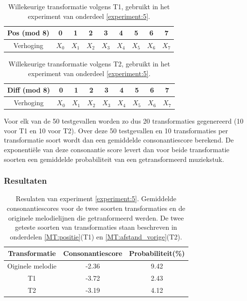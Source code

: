 \begin{table}
  \centering
  \begin{tabular}{c | c c c c c c c c }
    Pos (mod 8) & 0 & 1 & 2 & 3 & 4 & 5 & 6 & 7 \\
    \hline
    \hline
    Verhoging & $X_{0}$ & $X_{1}$ & $X_{2}$ & $X_{3}$ & $X_{4}$ & $X_{5}$ & $X_{6}$ & $X_{7}$ \\
  \end{tabular}
  \caption{Willekeurige transformatie volgens T1, gebruikt in het experiment van onderdeel \ref{experiment:5}.}
  \label{tabel:exp5:T1}
\end{table}

\begin{table}
  \centering
  \begin{tabular}{c | c c c c c c c c }
    Diff (mod 8) & 0 & 1 & 2 & 3 & 4 & 5 & 6 & 7 \\
    \hline
    \hline
    Verhoging & $X_{0}$ & $X_{1}$ & $X_{2}$ & $X_{3}$ & $X_{4}$ & $X_{5}$ & $X_{6}$ & $X_{7}$ \\
  \end{tabular}
  \caption{Willekeurige transformatie volgens T2, gebruikt in het experiment van onderdeel \ref{experiment:5}.}
  \label{tabel:exp5:T2}
\end{table}

Voor elk van de 50 testgevallen worden zo dus 20 transformaties gegenereerd (10 voor T1 en 10 voor T2). Over deze 50 testgevallen en 10 transformaties per transformatie soort wordt dan een gemiddelde consonantiescore berekend. De exponenti\"ele van deze consonantie score levert dan voor beide transformatie soorten een gemiddelde probabiliteit van een getransformeerd muziekstuk.

\subsubsection{Resultaten}

\begin{table}
  \centering
  \begin{tabular}{c | c c }    
    Transformatie & Consonantiescore & Probabiliteit(\%)\\
    \hline
    Oiginele melodie & -2.36 & 9.42\\
    T1 & -3.72 & 2.43\\
    T2 & -3.19 & 4.12\\
  \end{tabular}
  \caption{Resulaten van experiment \ref{experiment:5}. Gemiddelde consonantiescores voor de twee soorten transformaties en de originele melodielijnen die getranformeerd werden. De twee geteste soorten van transformaties staan beschreven in onderdelen \ref{MT:positie}(T1) en \ref{MT:afstand_vorige}(T2).}
  \label{tabel:res5}
\end{table}

